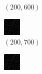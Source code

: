 \documentclass[a4paper, landscape]{article}
\begin{document}
\begin{figure}[H]
\begin{subfigure}{0.09\linewidth}
        \caption*{$(200, 600)$}
    \end{subfigure}
    \begin{subfigure}{0.09\linewidth}
        \centering
        \includegraphics[width=\linewidth]{omp/k = 200, m = 700.png}
        \caption*{$(200, 700)$}
    \end{subfigure}
    \begin{subfigure}{0.09\linewidth}
        \centering
        \includegraphics[width=\linewidth]{omp/k = 200, m = 800.png}

\end{subfigure}
\end{figure}
\end{document}
